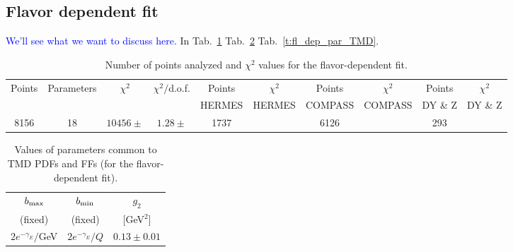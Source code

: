 \documentclass[aps,preprintnumbers,showpacs,nofootinbib,superscriptaddress,floatfix]{revtex4}
\begin{document}
\subsection{Flavor dependent fit}
\label{ss:fl_dep_fit}

\textcolor{blue}{We'll see what we want to discuss here.}
In Tab.~\ref{t:fl_dep_chi2} Tab.~\ref{t:fl_dep_parcommon} Tab.~\ref{t:fl_dep_par_TMD}.

\begin{table}[h!]
\small
  \centering
  \begin{tabular}{|c|c|c|c|c|c|c|c|c|c|}
\hline
\hline
Points& Parameters & $\chi^2$& $\chi^2/$d.o.f.& 
                  Points &$\chi^2$& Points &$\chi^2$& Points &$\chi^2$ 
 \\ 
      &    &    &  & HERMES    & HERMES   & COMPASS & COMPASS & DY \& Z & DY \& Z  \\
\hline
8156 & 18  & $10456 \pm  $ & $1.28 \pm  $ & 1737&  &6126 & & 293 &    \\
\hline
\hline
\end{tabular}
\caption{Number of points analyzed and $\chi^2$ values for the flavor-dependent fit.}
\label{t:fl_dep_chi2}
\end{table}
\begin{table}[h!]
\small
  \centering
  \begin{tabular}{|c|c|c|}
\hline
\hline
$b_{\rm max}$ & $b_{\rm min}$ &  $g_2$ 
 \\ 
 (fixed)     & (fixed)   & {[GeV$^2$]}                           \\
\hline
$2 e^{-\gamma_E}/$GeV& $2 e^{-\gamma_E}/Q$  & $0.13 \pm 0.01$  \\
\hline
\hline
\end{tabular}
\caption{Values of parameters common to TMD PDFs and FFs (for the flavor-dependent fit).}
\label{t:fl_dep_parcommon}
\end{table}
\end{document}
